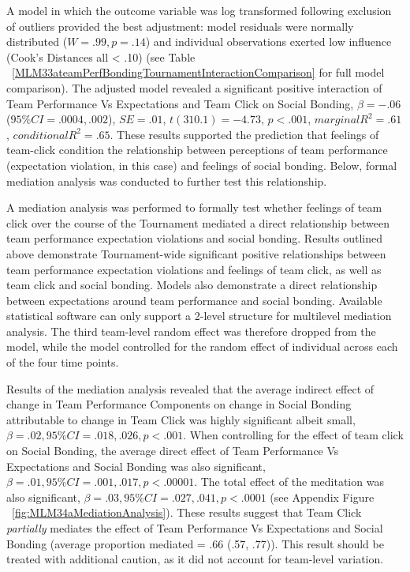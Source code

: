 \begin{CJK}{UTF8}{gbsn}
A model in which the outcome variable was log transformed following exclusion of outliers provided the best adjustment: model residuals were normally distributed ($W = .99, p = .14$) and individual observations exerted low influence (Cook's Distances all < .10) (see Table ~\ref{MLM33ateamPerfBondingTournamentInteractionComparison} for full model comparison). The adjusted model revealed a significant positive interaction of Team Performance Vs Expectations and Team Click on Social Bonding, $\beta = -.06$ ($95\% CI =  .0004, .002$), $SE = .01$, $t(310.1) = -4.73$, $p < .001$, $marginal R^2 = .61$, $conditional R^2 = .65$. These results supported the prediction that feelings of team-click condition the relationship between perceptions of team performance (expectation violation, in this case) and feelings of social bonding.  Below, formal mediation analysis was conducted to further test this relationship.


       

A mediation analysis was performed to formally test whether feelings of team click over the course of the Tournament mediated a direct relationship between team performance expectation violations and social bonding.  Results outlined above demonstrate Tournament-wide significant positive relationships between team performance expectation violations and feelings of team click, as well as team click and social bonding. Models also demonstrate a direct relationship between expectations around team performance and social bonding.  Available statistical software can only support a 2-level structure for multilevel mediation analysis. The third team-level random effect was therefore dropped from the model, while the model controlled for the random effect of individual across each of the four time points.

Results of the mediation analysis revealed that the average indirect effect of change in Team Performance Components on change in Social Bonding attributable to change in Team Click was highly significant albeit small, $\beta = .02, 95\% CI = .018 , .026, p < .001$.  When controlling for the effect of team click on Social Bonding, the average direct effect of Team Performance Vs Expectations and Social Bonding was also significant, $\beta = .01, 95\% CI = .001 , .017, p < .00001$.  The total effect of the meditation was also significant, $\beta = .03, 95\% CI = .027, .041, p < .0001$ (see Appendix Figure ~\ref{fig:MLM34aMediationAnalysis}).  These results suggest that Team Click \textit{partially} mediates the effect of Team Performance Vs Expectations and Social Bonding (average proportion mediated = .66 (.57, .77)).  This result should be treated with additional caution, as it did not account for team-level variation.


\end{CJK}
